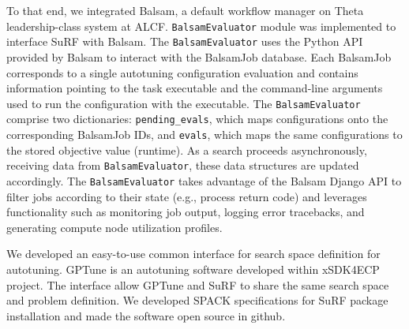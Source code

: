 To that end, we integrated Balsam, a default workflow manager on Theta leadership-class system at ALCF. \texttt{BalsamEvaluator} module was implemented to interface SuRF with Balsam. The \texttt{BalsamEvaluator} uses the Python API provided by Balsam to interact with the BalsamJob database. Each BalsamJob corresponds to a single autotuning configuration evaluation and contains information pointing to the task executable and the command-line arguments used to run the configuration with the executable. The \texttt{BalsamEvaluator} comprise two dictionaries: \texttt{pending\_evals}, which maps configurations onto the corresponding BalsamJob IDs, and \texttt{evals}, which maps the same configurations to the stored objective value (runtime). As a search proceeds asynchronously, receiving data from \texttt{BalsamEvaluator}, these data structures are updated accordingly. The \texttt{BalsamEvaluator} takes advantage of the Balsam Django API to filter jobs according to their state (e.g., process return code) and leverages functionality such as monitoring job output, logging error tracebacks, and generating compute node utilization profiles.

We developed an easy-to-use common interface for search space definition for autotuning. GPTune is an autotuning software developed within xSDK4ECP project. The interface allow GPTune and SuRF to share the same search space and problem definition. We developed SPACK specifications for SuRF package installation and made the software open source in github.



